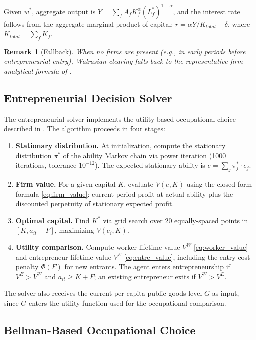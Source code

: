 \documentclass[12pt]{article}
\newtheorem{remark}{Remark}
\begin{document}
Given $w^*$, aggregate output is $Y = \sum_f A_f K_f^{\alpha} (L_f^*)^{1-\alpha}$, and the interest rate follows from the aggregate marginal product of capital: $r = \alpha Y / K_{total} - \delta$, where $K_{total} = \sum_f K_f$.

\begin{remark}[Fallback]
When no firms are present (e.g., in early periods before entrepreneurial entry), Walrasian clearing falls back to the representative-firm analytical formula of .
\end{remark}


\subsection{Entrepreneurial Decision Solver}\label{sec:entre_solver}

The entrepreneurial solver implements the utility-based occupational choice described in . The algorithm proceeds in four stages:
\begin{enumerate}
  \item \textbf{Stationary distribution.} At initialization, compute the stationary distribution $\pi^*$ of the ability Markov chain via power iteration (1000 iterations, tolerance $10^{-12}$). The expected stationary ability is $\bar{e} = \sum_j \pi^*_j \cdot e_j$.
  \item \textbf{Firm value.} For a given capital $K$, evaluate $V(e, K)$ using the closed-form formula \eqref{eq:firm_value}: current-period profit at actual ability plus the discounted perpetuity of stationary expected profit.
  \item \textbf{Optimal capital.} Find $K^*$ via grid search over 20 equally-spaced points in $[\underline{K}, a_{it} - F]$, maximizing $V(e_i, K)$.
  \item \textbf{Utility comparison.} Compute worker lifetime value $V^W$ \eqref{eq:worker_value} and entrepreneur lifetime value $V^E$ \eqref{eq:entre_value}, including the entry cost penalty $\Phi(F)$ for new entrants. The agent enters entrepreneurship if $V^E > V^W$ and $a_{it} \geq \underline{K} + F$; an existing entrepreneur exits if $V^W > V^E$.
\end{enumerate}

The solver also receives the current per-capita public goods level $G$ as input, since $G$ enters the utility function used for the occupational comparison.


\subsection{Bellman-Based Occupational Choice}\label{sec:bellman_occ}
\end{document}
